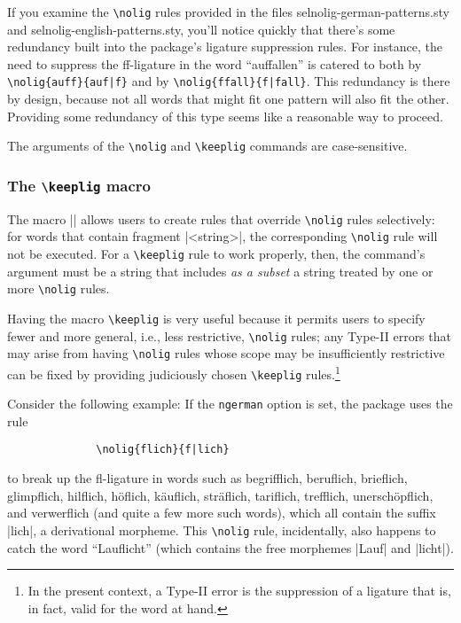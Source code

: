 \documentclass[11pt]{article}
\newcommand{\pkg}[1]{\textsf{#1}}
\newcommand{\opt}[1]{\texttt{#1}}
\newcommand{\cmmd}[1]{\texttt{\textbackslash #1}}
\begin{document}
If you examine the \cmmd{nolig} rules provided in the files \pkg{selnolig-german-patterns.sty} and \pkg{selnolig-english-patterns.sty}, you'll notice quickly that there's some redundancy built into the package's ligature suppression rules. For instance, the need to suppress the ff-ligature in the word \enquote{auffallen} is catered to both by \Verb+\nolig{auff}{auf|f}+ and by \Verb+\nolig{ffall}{f|fall}+. This redundancy is there by design, because not all words that might fit one pattern will also fit the other. Providing some redundancy of this type seems like a reasonable way to proceed.

The arguments of the \cmmd{nolig} and \cmmd{keeplig} commands are case-sensitive. 

\subsubsection{The \cmmd{keeplig} macro} 
\label{sec:keeplig}


The macro || allows users to create rules that override \cmmd{nolig} rules selectively: for words that contain fragment |<string>|, the corresponding \cmmd{nolig} rule will not be executed. For a \cmmd{keeplig} rule to work properly, then, the command's argument must be a string that includes \emph{as a subset} a string treated by one or more \cmmd{nolig} rules.

Having the macro \cmmd{keeplig} is very useful because it permits users to specify fewer and more general, i.e., less restrictive, \cmmd{nolig} rules; any Type-II errors that may arise from having \cmmd{nolig} rules whose scope may be insufficiently restrictive can be fixed by providing judiciously chosen \cmmd{keeplig} rules.\footnote{In the present context, a Type-II error is the suppression of a ligature that is, in fact, valid for the word at hand.}

Consider the following example: If the \opt{ngerman} option is set, the package uses the rule 
\begin{Verbatim}
              \nolig{flich}{f|lich}
\end{Verbatim}
to break up the fl-ligature in words such as begrifflich, beruflich, brieflich, glimpflich, hilflich, höflich, käuflich, s\breaklig träflich, tariflich, trefflich, unerschöpflich, and verwerflich (and quite a few more such words), which all contain the suffix |lich|, a derivational morpheme. This \cmmd{nolig} rule, incidentally, also happens to catch the word \enquote{Lauflicht} (which contains the free morphemes |Lauf| and |licht|). 
\end{document}
